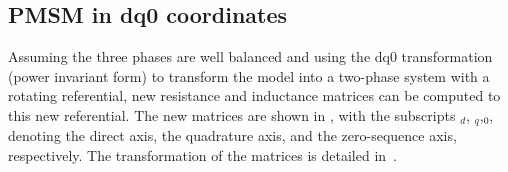 

\subsection{PMSM in dq0 coordinates}

Assuming the three phases are well balanced and using the dq0 transformation (power invariant form) to transform the model into a two-phase system with a rotating referential, new resistance and inductance matrices can be computed to this new referential. The new matrices are shown in , with the subscripts $_d$, $_q$,$_0$, denoting the direct axis, the quadrature axis, and the zero-sequence axis, respectively. The transformation of the matrices is detailed in~\citet{Marques:Dinamica_das_maquinas_eletricas:2002}.

